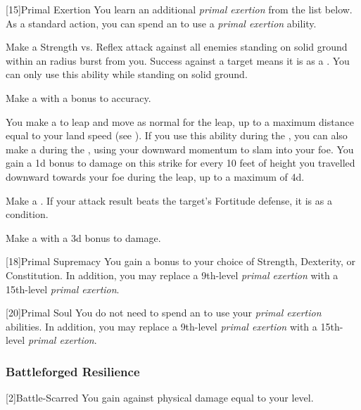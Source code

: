             [15]{Primal Exertion}
            You learn an additional \textit{primal exertion} from the list below.
            As a standard action, you can spend an  to use a \textit{primal exertion} ability.
            {
                 Make a Strength vs. Reflex attack against all enemies standing on solid ground within an \areamed radius burst from you.
                Success against a target means it is \stunned as a .
                You can only use this ability while standing on solid ground.

                 Make a  with a  bonus to accuracy.

                 You make a  to leap and move as normal for the leap, up to a maximum distance equal to your land speed (see ).
                If you use this ability during the , you can also make a  during the , using your downward momentum to slam into your foe.
                You gain a \plus1d bonus to damage on this strike for every 10 feet of height you travelled downward towards your foe during the leap, up to a maximum of \plus4d.

                 Make a .
                If your attack result beats the target's Fortitude defense, it is \stunned as a condition.

                 Make a  with a \plus3d bonus to damage.
            }

            [18]{Primal Supremacy}
            You gain a  bonus to your choice of Strength, Dexterity, or Constitution.
            In addition, you may replace a 9th-level \textit{primal exertion} with a 15th-level \textit{primal exertion}.

            [20]{Primal Soul} You do not need to spend an  to use your \textit{primal exertion} abilities.
            In addition, you may replace a 9th-level \textit{primal exertion} with a 15th-level \textit{primal exertion}.

        \subsubsection{Battleforged Resilience}
            [2]{Battle-Scarred} You gain  against physical damage equal to your level.

